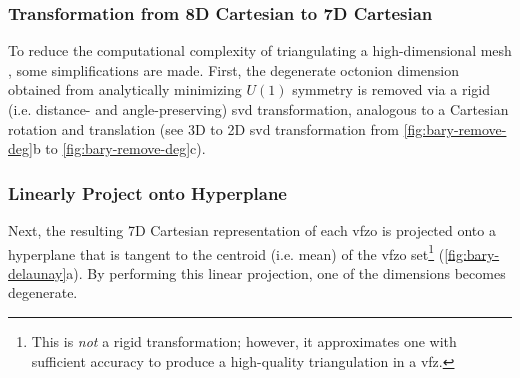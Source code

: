 \documentclass[final,twocolumn,12pt]{elsarticle}
\newcommand{\matlab}[1]{\mbox{\lstinline[style=Matlab-editor]{#1}}}
\begin{document}
\begin{appendices}
\subsubsection{ Transformation from 8D Cartesian to 7D Cartesian}
\label{sec:app:bary:tri:svd1}
 To reduce the computational complexity of triangulating a high-dimensional mesh \cite{barberQuickhullAlgorithmConvex1996}, some simplifications are made. First, the degenerate octonion dimension obtained from analytically minimizing $U(1)$ symmetry \cite{francisGeodesicOctonionMetric2019} is removed via a rigid (i.e. distance- and angle-preserving) \gls{svd} transformation,
analogous to a Cartesian rotation and translation (see 3D to 2D \gls{svd} transformation from \cref{fig:bary-remove-deg}b to \cref{fig:bary-remove-deg}c).

\subsubsection{Linearly Project onto Hyperplane}
\label{sec:app:bary:tri:project}
Next, the resulting 7D Cartesian representation of each \gls{vfzo} is projected onto a hyperplane that is tangent to the centroid (i.e. mean) of the \gls{vfzo} set\footnote{This is \textit{not} a rigid transformation; however, it approximates one with sufficient accuracy to produce a high-quality triangulation in a \gls{vfz}.} (\cref{fig:bary-delaunay}a). By performing this linear projection, one of the dimensions becomes degenerate.


\end{appendices}
\end{document}
